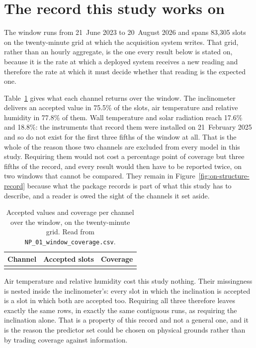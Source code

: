 \documentclass[11pt,a4paper]{article}
\begin{document}
\section{The record this study works on}
\label{sec:record}

The window runs from 21~June 2023 to 20~August 2026 and spans 83,305 slots on
the twenty-minute grid at which the acquisition system writes. That grid, rather
than an hourly aggregate, is the one every result below is stated on, because it
is the rate at which a deployed system receives a new reading and therefore the
rate at which it must decide whether that reading is the expected one.

Table~\ref{tab:coverage} gives what each channel returns over the window.
The inclinometer delivers an accepted value in 75.5\% of the slots, air
temperature and relative humidity in 77.8\% of them. Wall temperature and solar
radiation reach 17.6\% and 18.8\%: the instruments that record them were
installed on 21~February 2025 and so do not exist for the first three fifths of
the window at all. That is the whole of the reason those two channels are
excluded from every model in this study. Requiring them would not cost a
percentage point of coverage but three fifths of the record, and every result
would then have to be reported twice, on two windows that cannot be compared.
They remain in Figure~\ref{fig:on-structure-record} because what the package
records is part of what this study has to describe, and a reader is owed the
sight of the channels it set aside.

\begin{table}[H]
\centering
\caption{Accepted values and coverage per channel over the window, on the
twenty-minute grid. Read from \texttt{NP\_01\_window\_coverage.csv}.}
\label{tab:coverage}
\begin{tabular}{lrr}
\toprule
Channel & Accepted slots & Coverage \\
\midrule
\\
\bottomrule
\end{tabular}
\end{table}

Air temperature and relative humidity cost this study nothing. Their
missingness is nested inside the inclinometer's: every slot in which the
inclination is accepted is a slot in which both are accepted too. Requiring all
three therefore leaves exactly the same rows, in exactly the same contiguous
runs, as requiring the inclination alone. That is a property of this record and
not a general one, and it is the reason the predictor set could be chosen on
physical grounds rather than by trading coverage against information.
\end{document}
